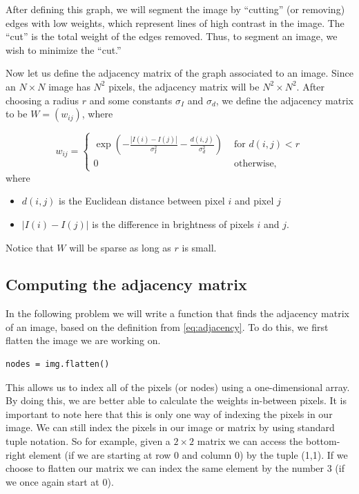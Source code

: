 After defining this graph, we will segment the image by ``cutting'' (or removing) edges with low weights, which represent lines of high contrast in the image. 
The ``cut'' is the total weight of the edges removed. Thus, to segment an image, we wish to minimize the ``cut.''

Now let us define the adjacency matrix of the graph associated to an image. 
Since an $N \times N$ image has $N^2$ pixels, the adjacency matrix will be $N^2 \times N^2$.
After choosing a radius $r$ and some constants $\sigma_I$ and $\sigma_d$, we define the adjacency matrix to be $W = (w_{ij})$, where

\begin{equation}
\label{eq:adjacency}
w_{ij} = \begin{cases} \exp(-\frac{|I(i) - I(j)|}{\sigma_I^2}-\frac{d(i,j)}{\sigma_d^2}) & \mbox{ for $d(i,j) < r$} \\ 0 & \mbox{ otherwise,} \end{cases}
\end{equation}
where
\begin{itemize}
	\item$d(i,j)$ is the Euclidean distance between pixel $i$ and pixel $j$
	\item $|I(i) - I(j)|$ is the difference in brightness of pixels $i$ and $j$.
\end{itemize}

Notice that $W$ will be sparse as long as $r$ is small.

\subsection*{Computing the adjacency matrix}

In the following problem we will write a function that finds the adjacency matrix of an image, based on the definition from \eqref{eq:adjacency}. To do this, we first flatten the image we are working on. 

\begin{lstlisting}
nodes = img.flatten()
\end{lstlisting}

This allows us to index all of the pixels (or nodes) using a one-dimensional array. By doing this, we are better able to calculate the weights in-between pixels. It is important to note here that this is only one way of indexing the pixels in our image. We can still index the pixels in our image or matrix by using standard tuple notation. So for example, given a $2 \times 2$ matrix we can access the bottom-right element (if we are starting at row 0 and column 0) by the tuple (1,1). If we choose to flatten our matrix we can index the same element by the number 3 (if we once again start at 0).

